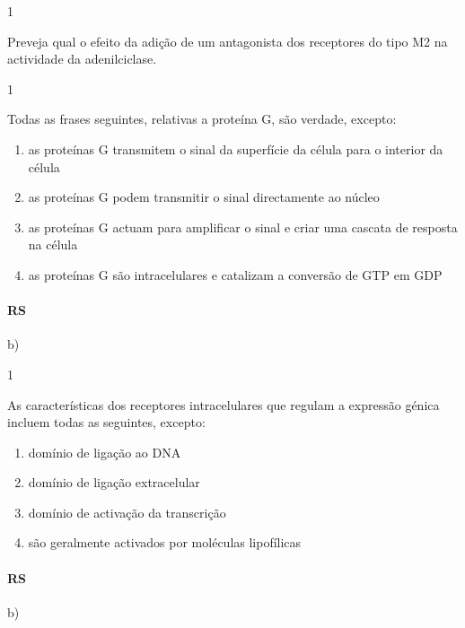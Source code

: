 \documentclass[\mainfilename]{subfiles}
\begin{document}
\begin{questionBox}1{} %
    
    Preveja qual o efeito da adição de um antagonista dos receptores do tipo M2 na actividade da adenilciclase.
    
\end{questionBox}

\begin{questionBox}1{} %
    
    Todas as frases seguintes, relativas a proteína G, são verdade, excepto:

    \begin{enumerate}[label=\alph{enumi})]
        \item as proteínas G transmitem o sinal da superfície da célula para o interior da célula 
        \item as proteínas G podem transmitir o sinal directamente ao núcleo
        \item as proteínas G actuam para amplificar o sinal e criar uma cascata de resposta na célula
        \item as proteínas G são intracelulares e catalizam a conversão de GTP em GDP
    \end{enumerate}

    \paragraph*{RS} b)
    
\end{questionBox}

\begin{questionBox}1{} %
    
    As características dos receptores intracelulares que regulam a expressão génica incluem todas as seguintes, excepto:
    
    \begin{enumerate}[label=\alph{enumi})]
        \item domínio de ligação ao DNA
        \item domínio de ligação extracelular
        \item domínio de activação da transcrição
        \item são geralmente activados por moléculas lipofílicas
    \end{enumerate}

    \paragraph*{RS} b)
    
\end{questionBox}
\end{document}
